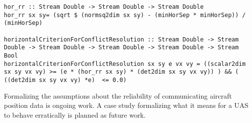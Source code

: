 %
%
%
%
\begin{lstlisting}[frame=single]
hor_rr :: Stream Double -> Stream Double -> Stream Double
hor_rr sx sy= (sqrt $ (normsq2dim sx sy) - (minHorSep * minHorSep)) / (minHorSep)

horizontalCriterionForConflictResolution :: Stream Double -> Stream Double -> Stream Double -> Stream Double -> Stream Double -> Stream Bool
horizontalCriterionForConflictResolution sx sy e vx vy = ((scalar2dim sx sy vx vy) >= (e * (hor_rr sx sy) * (det2dim sx sy vx vy)) ) && ( ((det2dim sx sy vx vy) *e)  <= 0.0)
\end{lstlisting}

Formalizing the assumptions about the reliability of communicating
aircraft position data is ongoing work.  A case study formalizing what
it means for a UAS to behave erratically is planned as future
work.  


%
%
%



